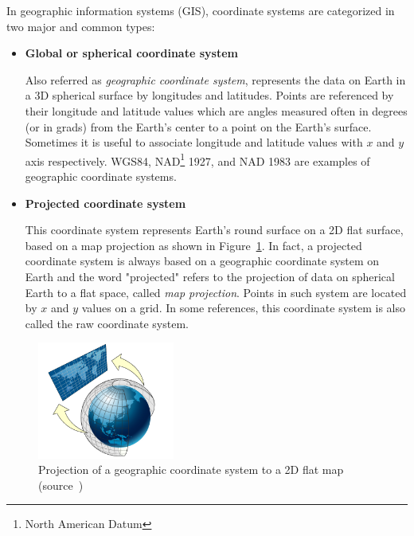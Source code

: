 \documentclass[a4paper,12pt]{article}
\begin{document}
  
In geographic information systems (GIS), coordinate systems are categorized in two major and common types:
\begin{itemize}
\item \textbf{Global or spherical coordinate system} 

Also referred as \textit{geographic coordinate system}, represents the data on Earth in a 3D spherical surface by longitudes and latitudes. Points are referenced by their longitude and latitude values which are angles measured often in degrees (or in grads) from the Earth's center to a point on the Earth's surface. Sometimes it is useful to associate longitude and latitude values with $x$ and $y$ axis respectively. WGS84, NAD\footnote{North American Datum} 1927, and NAD 1983 are examples of geographic coordinate systems. 

\item \textbf{Projected coordinate system} 

This coordinate system represents Earth's round surface on a 2D flat surface, based on a map projection as shown in Figure~\ref{figproject}. In fact, a projected coordinate system is always based on a geographic coordinate system on Earth and the word "projected" refers to the projection of data on spherical Earth to a flat space, called \textit{map projection}. Points in such system are located by $x$ and $y$ values on a grid. 
In some references, this coordinate system is also called the raw coordinate system.
\end{itemize}

\begin{figure}
\centering
\includegraphics[width=0.4\textwidth]{sphere_to_cylinder}
\caption{Projection of a geographic coordinate system to a 2D flat map (source~\cite{projected})}
\label{figproject}
\end{figure}
\end{document}

